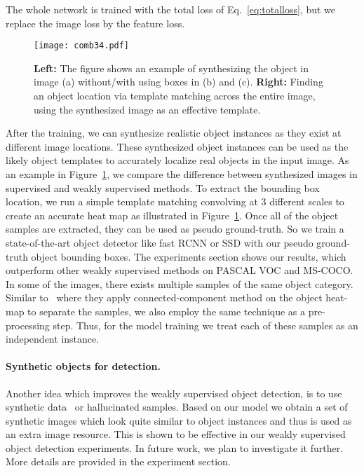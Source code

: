 \documentclass[runningheads]{llncs}
\begin{document}
\noindent The whole network is trained with the total loss of Eq.~\ref{eq:totalloss}, but we replace the image loss by the feature loss.


 
\begin{figure}[t]
\centering
{\texttt{[image: comb34.pdf]} 
} \caption{\textbf{Left:} The figure shows an example of synthesizing the object in image (a) without/with using boxes in (b) and (c). \textbf{Right:} Finding an object location via template matching across the entire image, using the synthesized image as an effective template.} 
\label{fig:tmpmatch&sample}
\end{figure}

\iffalse
 \begin{figure}[t]
\centering
{\texttt{[image: figs3.pdf]} 
} \caption{Finding an object location via template matching across the entire image, using the synthesized image as an effective template.
 } 
\label{fig:tmpmatch}
\end{figure}
\fi


After the training, we can synthesize realistic object instances as they exist at different image locations. These synthesized object instances can be used as the likely object templates to accurately localize real objects in the input image. As an example in Figure~\ref{fig:tmpmatch&sample}, we compare the difference between synthesized images in supervised and weakly supervised methods. 
\noindent To extract the bounding box location, we run a simple template matching convolving at 3 different scales to create an accurate heat map as illustrated in Figure~\ref{fig:tmpmatch&sample}. Once all of the object samples are extracted, they can be used as pseudo ground-truth. So we train a state-of-the-art object detector like fast RCNN or SSD \cite{fastRCNN,SSD} with our pseudo ground-truth object bounding boxes. The experiments section shows our results, which outperform other weakly supervised methods on PASCAL VOC and MS-COCO. In some of the images, there exists multiple samples of the same object category. Similar to~\cite{gap}  where they apply connected-component method on the object heat-map to separate the samples, we also employ the same technique as a pre-processing step. Thus, for the model training we treat each of these samples as an independent instance.

\paragraph*{Synthetic objects for detection.} Another idea which improves the weakly supervised object detection, is to use synthetic data~\cite{3dSynth} or hallucinated samples. Based on our model we obtain a set of synthetic images which look quite similar to object instances and thus is used as an extra image resource. This is shown to be effective in our weakly supervised object detection experiments. In future work, we plan to investigate it further. More details are provided in the experiment section.
\end{document}

